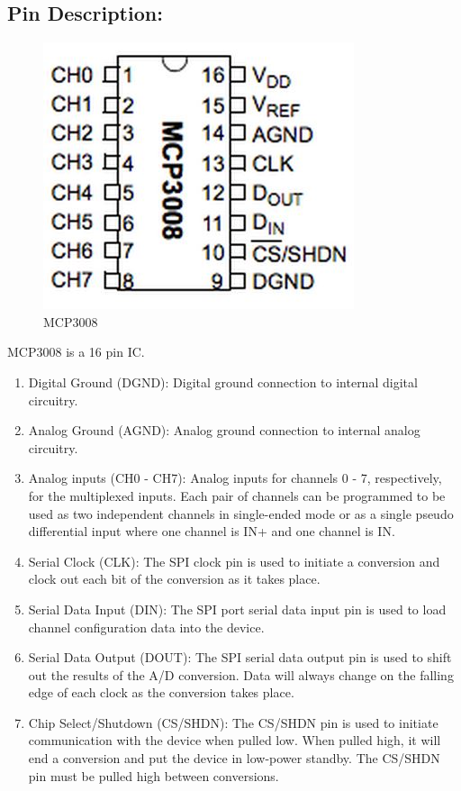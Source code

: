 \documentclass[11pt,a4paper]{article}
\begin{document}
\subsection{Pin Description:} 
	\begin{figure}[h!]
		\includegraphics[scale=0.7]{mcp.jpg}
		\centering
		\caption{MCP3008}
	\end{figure}
MCP3008 is a 16 pin IC.	
\begin{enumerate}
\item Digital Ground (DGND): \newline Digital ground connection to internal digital circuitry.
\item Analog Ground (AGND):  \newline Analog ground connection to internal analog circuitry.
\item Analog inputs (CH0 - CH7): \newline Analog inputs for channels 0 - 7, respectively, for the multiplexed inputs. Each pair of channels can be programmed to be used as two independent channels in single-ended mode or as a single pseudo differential input where one channel is IN+ and one channel is IN.
\item Serial Clock (CLK): \newline The SPI clock pin is used to initiate a conversion and clock out each bit of the conversion as it takes place.
\item  Serial Data Input (DIN): \newline The SPI port serial data input pin is used to load channel configuration data into the device.
\item Serial Data Output (DOUT): \newline The SPI serial data output pin is used to shift out the results of the A/D conversion. Data will always change on the falling edge of each clock as the conversion takes place.
\item Chip Select/Shutdown (CS/SHDN): \newline The CS/SHDN pin is used to initiate communication with the device when pulled low. When pulled high, it will end a conversion and put the device in low-power standby. The CS/SHDN pin must be pulled high between conversions.
\end{enumerate}
\end{document}
